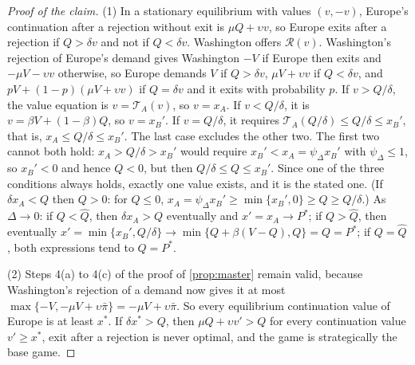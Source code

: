 \begin{proof}[Proof of the claim]
(1) In a stationary equilibrium with values $(v,-v)$, Europe's continuation after a rejection without exit is $\mu Q+\upsilon v$, so Europe exits after a rejection if $Q>\delta v$ and not if $Q<\delta v$. Washington offers $\mathcal R(v)$. Washington's rejection of Europe's demand gives Washington $-V$ if Europe then exits and $-\mu V-\upsilon v$ otherwise, so Europe demands $V$ if $Q>\delta v$, $\mu V+\upsilon v$ if $Q<\delta v$, and $pV+(1-p)(\mu V+\upsilon v)$ if $Q=\delta v$ and it exits with probability $p$. If $v>Q/\delta$, the value equation is $v=\mathcal T_A(v)$, so $v=x_A$. If $v<Q/\delta$, it is $v=\beta V+(1-\beta)Q$, so $v=x_B'$. If $v=Q/\delta$, it requires $\mathcal T_A(Q/\delta)\le Q/\delta\le x_B'$, that is, $x_A\le Q/\delta\le x_B'$. The last case excludes the other two. The first two cannot both hold: $x_A>Q/\delta>x_B'$ would require $x_B'<x_A=\psi_\Delta x_B'$ with $\psi_\Delta\le 1$, so $x_B'<0$ and hence $Q<0$, but then $Q/\delta\le Q\le x_B'$. Since one of the three conditions always holds, exactly one value exists, and it is the stated one. (If $\delta x_A<Q$ then $Q>0$: for $Q\le0$, $x_A=\psi_\Delta x_B'\ge\min\{x_B',0\}\ge Q\ge Q/\delta$.) As $\Delta\to 0$: if $Q<\hat Q$, then $\delta x_A>Q$ eventually and $x'=x_A\to P^*$; if $Q>\hat Q$, then eventually $x'=\min\{x_B',Q/\delta\}\to\min\{Q+\beta(V-Q),Q\}=Q=P^*$; if $Q=\hat Q$, both expressions tend to $Q=P^*$.

(2) Steps 4(a) to 4(c) of the proof of \cref{prop:master} remain valid, because Washington's rejection of a demand now gives it at most $\max\{-V,-\mu V+\upsilon\bar\pi\}=-\mu V+\upsilon\bar\pi$. So every equilibrium continuation value of Europe is at least $x^*$. If $\delta x^*>Q$, then $\mu Q+\upsilon v'>Q$ for every continuation value $v'\ge x^*$, exit after a rejection is never optimal, and the game is strategically the base game.


\end{proof}
